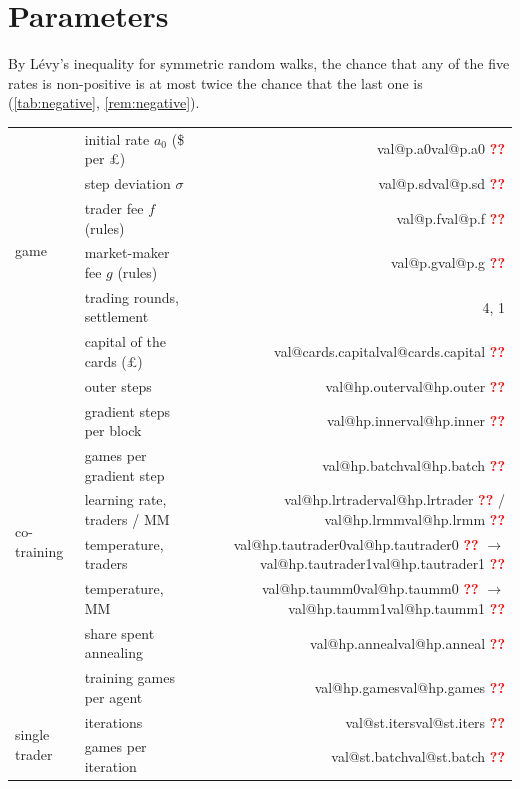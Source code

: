 \documentclass[11pt,a4paper]{article}
\makeatletter
\theoremstyle{plain}
\theoremstyle{definition}
\newcommand{\val}[1]{\ifcsname val@#1\endcsname\csname val@#1\endcsname\else
  \textcolor{red}{\textbf{??\detokenize{#1}}}\PackageWarning{paper}{Missing value #1}\fi}
\newcommand{\1}{\mathbf{1}}
\makeatother
\begin{document}
\appendix
\section{Parameters}\label{app:parameters}
By L\'evy's inequality for symmetric random walks, the chance that any of the five rates is non-positive is at most twice the chance that the last one is (\cref{tab:negative}, \cref{rem:negative}).

\begin{table}[!htb]
\centering\small
\begin{minipage}[t]{0.58\textwidth}
\centering
{}
\label{tab:params}
\footnotesize\setlength{\tabcolsep}{3pt}
\begin{tabular}{@{}llr@{}}
\toprule
\multirow{6}{*}{game} & initial rate $a_0$ (\$ per \pounds) & \val{p.a0}\\
 & step deviation $\sigma$ & \val{p.sd}\\
 & trader fee $f$ (rules) & \val{p.f}\\
 & market-maker fee $g$ (rules) & \val{p.g}\\
 & trading rounds, settlement & 4, 1\\
 & capital of the cards (\pounds) & \val{cards.capital}\\
\midrule
\multirow{8}{*}{co-training} & outer steps & \val{hp.outer}\\
 & gradient steps per block & \val{hp.inner}\\
 & games per gradient step & \val{hp.batch}\\
 & learning rate, traders / MM & \val{hp.lrtrader} / \val{hp.lrmm}\\
 & temperature, traders & \val{hp.tautrader0} $\to$ \val{hp.tautrader1}\\
 & temperature, MM & \val{hp.taumm0} $\to$ \val{hp.taumm1}\\
 & share spent annealing & \val{hp.anneal}\\
 & training games per agent & \val{hp.games}\\
\midrule
\multirow{2}{*}{single trader} & iterations & \val{st.iters}\\
 & games per iteration & \val{st.batch}\\
\bottomrule
\end{tabular}

\end{minipage}
\end{table}
\end{document}
